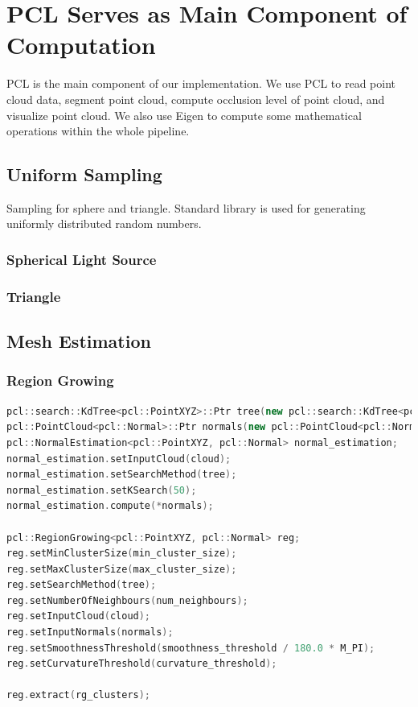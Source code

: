 \documentclass[11pt, a4paper,oneside,chapterprefix=false]{scrbook}
\begin{document}
\section{PCL Serves as Main Component of Computation} \label{sec:pcl and eigen}

PCL is the main component of our implementation. We use PCL to read point cloud data, segment point cloud, compute occlusion level of point cloud, and visualize point cloud. We also use Eigen to compute some mathematical operations within the whole pipeline.

\subsection{Uniform Sampling} \label{subsec:uniform sampling}

Sampling for sphere and triangle. Standard library is used for generating uniformly distributed random numbers.

\subsubsection{Spherical Light Source}

\subsubsection{Triangle}

\subsection{Mesh Estimation} \label{sec:mesh estimation}

\subsubsection{Region Growing}

\begin{lstlisting}[language=C++, caption=Region Growing]
pcl::search::KdTree<pcl::PointXYZ>::Ptr tree(new pcl::search::KdTree<pcl::PointXYZ>());
pcl::PointCloud<pcl::Normal>::Ptr normals(new pcl::PointCloud<pcl::Normal>);
pcl::NormalEstimation<pcl::PointXYZ, pcl::Normal> normal_estimation;
normal_estimation.setInputCloud(cloud);
normal_estimation.setSearchMethod(tree);
normal_estimation.setKSearch(50);
normal_estimation.compute(*normals);

pcl::RegionGrowing<pcl::PointXYZ, pcl::Normal> reg;
reg.setMinClusterSize(min_cluster_size);
reg.setMaxClusterSize(max_cluster_size);
reg.setSearchMethod(tree);
reg.setNumberOfNeighbours(num_neighbours);
reg.setInputCloud(cloud);
reg.setInputNormals(normals);
reg.setSmoothnessThreshold(smoothness_threshold / 180.0 * M_PI);
reg.setCurvatureThreshold(curvature_threshold);

reg.extract(rg_clusters);
\end{lstlisting}
\end{document}
